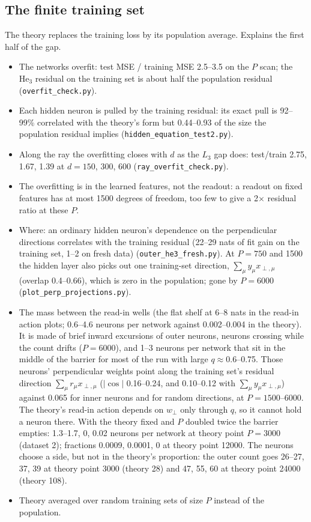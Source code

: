 \documentclass[11pt,a4paper]{article}
\newcommand{\mworked}{\textcolor{worked}{\Large$\bm\checkmark$}}
\newcommand{\mtodo}{\textcolor{neutral}{\Large$\square$}}
\newcommand{\worked}{\item[\mworked]}
\newcommand{\todo}{\item[\mtodo]}
\begin{document}
\subsection*{The finite training set}
The theory replaces the training loss by its population average. Explains the first half of the gap.
\begin{itemize}
\worked The networks overfit: test MSE / training MSE 2.5--3.5 on the $P$ scan; the $\mathrm{He}_3$ residual on the
  training set is about half the population residual (\texttt{overfit\_check.py}).
\worked Each hidden neuron is pulled by the training residual: its exact pull is 92--99\% correlated with the theory's
  form but 0.44--0.93 of the size the population residual implies (\texttt{hidden\_equation\_test2.py}).
\worked Along the ray the overfitting closes with $d$ as the $L_3$ gap does: test/train 2.75, 1.67, 1.39 at $d=150$,
  300, 600 (\texttt{ray\_overfit\_check.py}).
\worked The overfitting is in the learned features, not the readout: a readout on fixed features has at most 1500
  degrees of freedom, too few to give a 2$\times$ residual ratio at these $P$.
\worked Where: an ordinary hidden neuron's dependence on the perpendicular directions correlates with the training
  residual (22--29 nats of fit gain on the training set, 1--2 on fresh data) (\texttt{outer\_he3\_fresh.py}). At
  $P=750$ and 1500 the hidden layer also picks out one training-set direction, $\sum_\mu y_\mu x_{\perp,\mu}$
  (overlap 0.4--0.66), which is zero in the population; gone by $P=6000$ (\texttt{plot\_perp\_projections.py}).
\worked The mass between the read-in wells (the flat shelf at 6--8 nats in the read-in action plots; 0.6--4.6 neurons
  per network against 0.002--0.004 in the theory). It is made of brief inward excursions of outer neurons, neurons
  crossing while the count drifts ($P=6000$), and 1--3 neurons per network that sit in the middle of the barrier for
  most of the run with large $q\approx0.6$--0.75. Those neurons' perpendicular weights point along the training set's
  residual direction $\sum_\mu r_\mu x_{\perp,\mu}$ ($|\cos|$ 0.16--0.24, and 0.10--0.12 with $\sum_\mu y_\mu x_{\perp,\mu}$)
  against 0.065 for inner neurons and for random directions, at $P=1500$--6000. The theory's read-in action depends on
  $w_\perp$ only through $q$, so it cannot hold a neuron there. With the theory fixed and $P$ doubled twice the barrier
  empties: 1.3--1.7, 0, 0.02 neurons per network at theory point $P=3000$ (dataset 2); fractions 0.0009, 0.0001, 0 at
  theory point 12000. The neurons choose a side, but not in the theory's proportion: the outer count goes 26--27, 37, 39
  at theory point 3000 (theory 28) and 47, 55, 60 at theory point 24000 (theory 108).
\todo Theory averaged over random training sets of size $P$ instead of the population.
\end{itemize}
\end{document}
